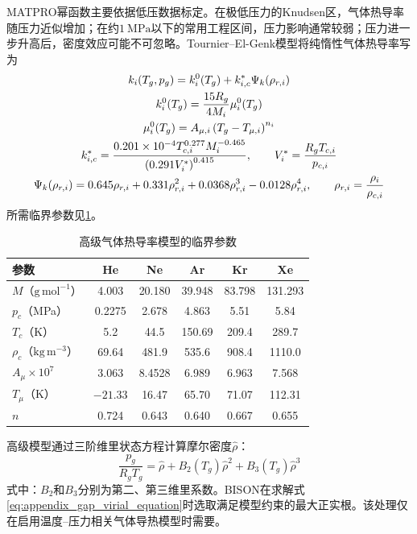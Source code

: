 MATPRO幂函数主要依据低压数据标定。在极低压力的Knudsen区，气体热导率随压力近似增加；在约$1\ \mathrm{MPa}$以下的常用工程区间，压力影响通常较弱；压力进一步升高后，密度效应可能不可忽略\cite{toptanGapConductanceModeling2019,tournierPropertiesNobleGases2008}。Tournier--El-Genk模型将纯惰性气体热导率写为
\begin{gather}
	k_i(T_g,p_g)
	=k_i^0(T_g)+k_{i,c}^{*}\Psi_k(\rho_{r,i})
	\notag
	\\
	k_i^0(T_g)
	=\frac{15R_g}{4M_i}\mu_i^0(T_g)
	\notag
	\\
	\mu_i^0(T_g)
	=A_{\mu,i}\left(T_g-T_{\mu,i}\right)^{n_i}
	\notag
	\\
	k_{i,c}^{*}
	=\frac{0.201\times10^{-4}
		T_{c,i}^{0.277}M_i^{-0.465}}
	{\left(0.291V_i^{*}\right)^{0.415}},
	\qquad
	V_i^{*}=\frac{R_gT_{c,i}}{p_{c,i}}
	\notag
	\\
	\Psi_k(\rho_{r,i})
	=0.645\rho_{r,i}
	+0.331\rho_{r,i}^2
	+0.0368\rho_{r,i}^3
	-0.0128\rho_{r,i}^4,
	\qquad
	\rho_{r,i}=\frac{\rho_i}{\rho_{c,i}}
	\label{eq:appendix_gap_advanced_conductivity_model}
\end{gather}
所需临界参数见\tablename\ref{tab:appendix_gap_critical_gas_properties}。

\begin{table}[htbp]
	\centering
	\caption{高级气体热导率模型的临界参数\cite{tournierPropertiesNobleGases2008}}
	\label{tab:appendix_gap_critical_gas_properties}
	\begin{tabular*}{\textwidth}{
			@{\extracolsep{\fill}}
			lccccc
			@{}
		}
		\toprule
		参数 & He & Ne & Ar & Kr & Xe \\
		\midrule
		$M$（$\mathrm{g\,mol^{-1}}$） & 4.003 & 20.180 & 39.948 & 83.798 & 131.293 \\
		$p_c$（MPa） & 0.2275 & 2.678 & 4.863 & 5.51 & 5.84 \\
		$T_c$（K） & 5.2 & 44.5 & 150.69 & 209.4 & 289.7 \\
		$\rho_c$（$\mathrm{kg\,m^{-3}}$） & 69.64 & 481.9 & 535.6 & 908.4 & 1110.0 \\
		$A_\mu\times10^7$ & 3.063 & 8.4528 & 6.989 & 6.963 & 7.568 \\
		$T_\mu$（K） & $-21.33$ & 16.47 & 65.70 & 71.07 & 112.31 \\
		$n$ & 0.724 & 0.643 & 0.640 & 0.667 & 0.655 \\
		\bottomrule
	\end{tabular*}
\end{table}

高级模型通过三阶维里状态方程计算摩尔密度$\hat\rho$：
\begin{equation}
	\frac{p_g}{R_gT_g}
	=\hat\rho+B_2(T_g)\hat\rho^2+B_3(T_g)\hat\rho^3
	\label{eq:appendix_gap_virial_equation}
\end{equation}
式中：$B_2$和$B_3$分别为第二、第三维里系数。BISON在求解式\eqref{eq:appendix_gap_virial_equation}时选取满足模型约束的最大正实根。该处理仅在启用温度--压力相关气体导热模型时需要。


